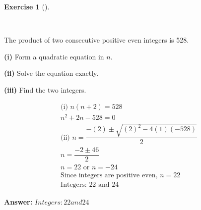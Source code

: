 \documentclass[
  letterpaper,
  DIV=11,
  numbers=noendperiod]{scrreprt}
\theoremstyle{definition}
\newtheorem{exercise}{Exercise}[chapter]
\theoremstyle{remark}
\begin{document}
\begin{exercise}[]\protect\hypertarget{exr-u6-25-3}{}\label{exr-u6-25-3}

~

The product of two consecutive positive even integers is 528.

\textbf{(i)} Form a quadratic equation in \(n\).

\textbf{(ii)} Solve the equation exactly.

\textbf{(iii)} Find the two integers.

\begin{tcolorbox}[enhanced jigsaw, opacitybacktitle=0.6, coltitle=black, arc=.35mm, colframe=quarto-callout-tip-color-frame, colback=white, bottomrule=.15mm, left=2mm, colbacktitle=quarto-callout-tip-color!10!white, titlerule=0mm, opacityback=0, title=\textcolor{quarto-callout-tip-color}{\faLightbulb}\hspace{0.5em}{🔍 View Solution}, leftrule=.75mm, breakable, rightrule=.15mm, bottomtitle=1mm, toptitle=1mm, toprule=.15mm]

\begin{align*}
\text{(i) } n(n+2) = 528 \\ n^2 + 2n - 528 = 0 \\ \text{(ii) } n = \dfrac{-(2) \pm \sqrt{(2)^2 - 4(1)(-528)}}{2} \\ n = \dfrac{-2 \pm 46}{2} \\ n = 22 \text{ or } n = -24 \\ \text{Since integers are positive even, } n = 22 \\ \text{Integers: } 22 \text{ and } 24
\end{align*}

\textbf{Answer:} \(Integers: 22 and 24\)

\end{tcolorbox}

\end{exercise}
\end{document}
